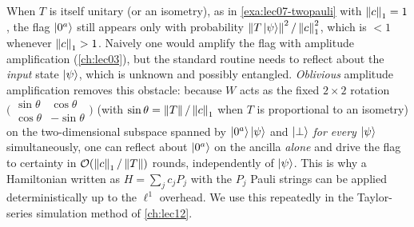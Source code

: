 \begin{remark}
\label{rem:lec07-oaa}
When $T$ is itself unitary (or an isometry), as in \cref{exa:lec07-twopauli} with
$\left\lVert c \right\rVert_1=1$, the flag $\ket{0^a}$ still appears only with probability
$\left\lVert T\ket\psi \right\rVert^2/\left\lVert c \right\rVert_1^2$, which is $<1$ whenever $\left\lVert c \right\rVert_1>1$. Naively one
would amplify the flag with amplitude amplification (\cref{ch:lec03}), but the
standard routine needs to reflect about the \emph{input} state $\ket{\psi}$, which
is unknown and possibly entangled. \emph{Oblivious} amplitude amplification removes
this obstacle: because $W$ acts as the fixed $2\times2$ rotation
$\bigl(\begin{smallmatrix}\sin\theta&\cos\theta\\ \cos\theta&-\sin\theta
\end{smallmatrix}\bigr)$ (with $\sin\theta=\left\lVert T \right\rVert/\left\lVert c \right\rVert_1$ when $T$ is
proportional to an isometry) on the two-dimensional subspace spanned by
$\ket{0^a}\ket\psi$ and $\ket\perp$ \emph{for every} $\ket\psi$ simultaneously, one
can reflect about $\ket{0^a}$ on the ancilla \emph{alone} and drive the flag to
certainty in $\mathcal{O}(\left\lVert c \right\rVert_1/\left\lVert T \right\rVert)$ rounds, independently of $\ket\psi$. This
is why a Hamiltonian written as $H=\sum_j c_j P_j$ with the $P_j$ Pauli strings can
be applied deterministically up to the $\ell^1$ overhead. We use this repeatedly in
the Taylor-series simulation method of \cref{ch:lec12}.
\end{remark}

